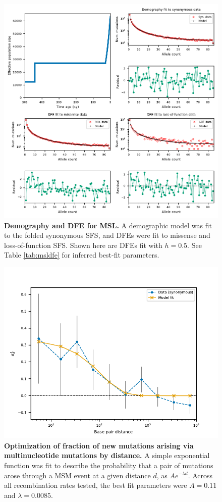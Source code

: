 \documentclass[]{article}
\begin{document}
\begin{figure}[ht!]
    \centering
    \includegraphics{../figures/msl_demography_dfes}
    \caption{
        \textbf{Demography and DFE for MSL.} A demographic model was fit to
        the folded synonymous SFS, and DFEs were fit to missense and loss-of-function
        SFS. Shown here are DFEs fit with \(h=0.5\). See Table \ref{tab:msldfe} for
        inferred best-fit parameters.
    }
    \label{fig:msldemogdfe}
\end{figure}

\begin{figure}[ht!]
    \centering
    \includegraphics{../figures/msl_mnms.v2}
    \caption{
        \textbf{Optimization of fraction of new mutations arising via
        multinucleotide mutations by distance.} A simple exponential function was fit
        to describe the probability that a pair of mutations arose through a MSM event
        at a given distance \(d\), as \(Ae^{-\lambda d}\). Across all recombination rates
        tested, the best fit parameters were \(A=0.11\) and \(\lambda=0.0085\).
    }
    \label{fig:mslmnms}
\end{figure}
\end{document}
